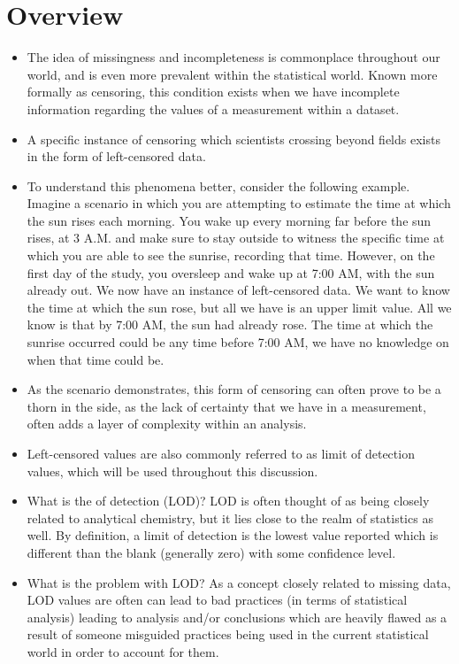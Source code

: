 \documentclass[12pt, twoside]{amherstthesis}
\begin{document}
\hypertarget{overview}{%
\section{Overview}\label{overview}}
\begin{itemize}
\item
  The idea of missingness and incompleteness is commonplace throughout our world, and is even more prevalent within the statistical world. Known more formally as censoring, this condition exists when we have incomplete information regarding the values of a measurement within a dataset.
\item
  A specific instance of censoring which scientists crossing beyond fields exists in the form of left-censored data.
\item
  To understand this phenomena better, consider the following example. Imagine a scenario in which you are attempting to estimate the time at which the sun rises each morning. You wake up every morning far before the sun rises, at 3 A.M. and make sure to stay outside to witness the specific time at which you are able to see the sunrise, recording that time. However, on the first day of the study, you oversleep and wake up at 7:00 AM, with the sun already out. We now have an instance of left-censored data. We want to know the time at which the sun rose, but all we have is an upper limit value. All we know is that by 7:00 AM, the sun had already rose. The time at which the sunrise occurred could be any time before 7:00 AM, we have no knowledge on when that time could be.
\item
  As the scenario demonstrates, this form of censoring can often prove to be a thorn in the side, as the lack of certainty that we have in a measurement, often adds a layer of complexity within an analysis.
\item
  Left-censored values are also commonly referred to as limit of detection values, which will be used throughout this discussion.
\item
  What is the of detection (LOD)? LOD is often thought of as being closely related to analytical chemistry, but it lies close to the realm of statistics as well. By definition, a limit of detection is the lowest value reported which is different than the blank (generally zero) with some confidence level.
\item
  What is the problem with LOD? As a concept closely related to missing data, LOD values are often can lead to bad practices (in terms of statistical analysis) leading to analysis and/or conclusions which are heavily flawed as a result of someone misguided practices being used in the current statistical world in order to account for them.

\end{itemize}
\end{document}
